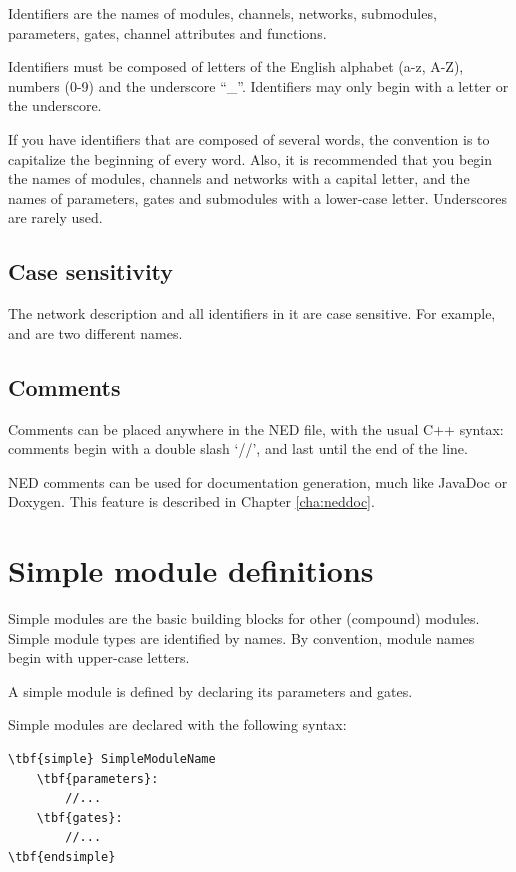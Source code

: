 Identifiers are the names of modules, channels, networks,
submodules, parameters, gates, channel attributes and functions.

Identifiers must be composed of letters of the English alphabet (a-z, A-Z),
numbers (0-9) and the underscore ``\_''.
Identifiers may only begin with a letter or the underscore.

If you have identifiers that are composed of several words, the convention
is to capitalize the beginning of every word. Also, it is recommended
that you begin the names of modules, channels and networks with
a capital letter, and the names of parameters, gates and submodules
with a lower-case letter. Underscores are rarely used.


\subsection{Case sensitivity}

The network description and all identifiers in it are case sensitive.
For example,  and  are two different names.


\subsection{Comments}

Comments can be placed anywhere in the NED file, with the usual C++
syntax: comments begin with a double slash `//', and last until
the end of the line.

NED comments can be used for documentation generation,
much like JavaDoc or Doxygen. This feature is described in
Chapter \ref{cha:neddoc}.


\section{Simple module definitions}

Simple modules are the basic building blocks for other (compound)
modules. Simple module types are identified by names.
By convention, module names begin with upper-case letters.

A simple module is defined by
declaring its parameters and
gates.

Simple modules are declared with the following syntax:

\begin{Verbatim}[commandchars=\\\{\}]
\tbf{simple} SimpleModuleName
    \tbf{parameters}:
        //...
    \tbf{gates}:
        //...
\tbf{endsimple}
\end{Verbatim}


